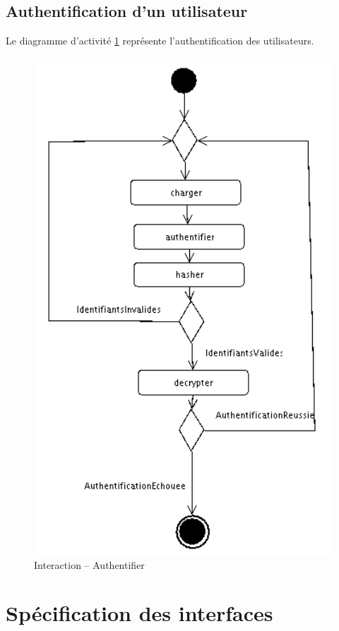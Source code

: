 \subsection{Authentification d'un utilisateur}

Le diagramme d'activité \ref{authSequence} représente l'authentification des utilisateurs.

\begin{figure}[!htbp]
\centering
\includegraphics[width=12cm]{images/L3/diagrammeActivite/authentification.png}
\caption{Interaction \--- Authentifier}
\label{authSequence}
\end{figure}

\section{Spécification des interfaces}

